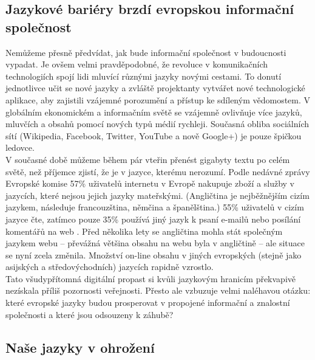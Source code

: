 \begin{multicols}{2}
\subsection{Jazykové bariéry brzdí evropskou informační společnost}

Nemůžeme přesně předvídat, jak bude informační společnost v budoucnosti vypadat. Je ovšem velmi pravděpodobné, že revoluce v komunikačních technologiích spojí lidi mluvící různými jazyky novými cestami. To donutí jednotlivce učit se nové jazyky a zvláště projektanty vytvářet nové technologické aplikace, aby zajistili vzájemné porozumění a přístup ke sdíleným vědomostem. V globálním ekonomickém a informačním světě se vzájemně ovlivňuje více jazyků, mluvčích a obsahů pomocí nových typů médií rychleji. Současná obliba sociálních sítí (Wikipedia, Facebook, Twitter, YouTube a nově Google+) je pouze špičkou ledovce.\\
V současné době můžeme během pár vteřin přenést gigabyty textu po celém světě, než příjemce zjistí, že je v jazyce, kterému nerozumí. Podle nedávné zprávy Evropské komise 57\% uživatelů internetu v Evropě nakupuje zboží a služby v jazycích, které nejsou jejich jazyky mateřskými. (Angličtina je nejběžnějším cizím jazykem, následuje francouzština, němčina a španělština.) 55\% uživatelů v cizím jazyce čte, zatímco pouze 35\% používá jiný jazyk k psaní e-mailů nebo posílání komentářů na web \cite{EC1}. Před několika lety se angličtina mohla stát společným jazykem webu – převážná většina obsahu na webu byla v angličtině – ale situace se nyní zcela změnila. Množství on-line obsahu v jiných evropských (stejně jako asijských a středovýchodních) jazycích rapidně vzrostlo.\\
Tato všudypřítomná digitální propast si kvůli jazykovým hranicím překvapivě nezískala příliš pozornosti veřejnosti. Přesto ale vzbuzuje velmi naléhavou otázku: které evropské jazyky budou prosperovat v propojené informační a znalostní společnosti a které jsou odsouzeny k záhubě?

\subsection{Naše jazyky v ohrožení}


\end{multicols}
